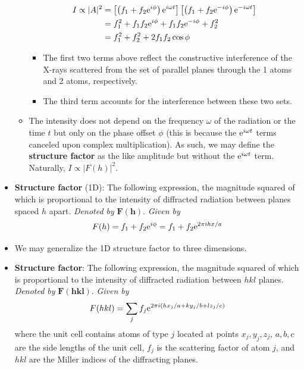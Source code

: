 \documentclass[../notes.tex]{subfiles}
\begin{document}
\begin{itemize}
\begin{itemize}
        \begin{align*}
            I \propto |A|^2 &= \left[ \left( f_1+f_2\e[i\phi] \right)\e[i\omega t] \right]\left[ \left( f_1+f_2\e[-i\phi] \right)\e[-i\omega t] \right]\\
            &= f_1^2+f_1f_2\e[i\phi]+f_1f_2\e[-i\phi]+f_2^2\\
            &= f_1^2+f_2^2+2f_1f_2\cos\phi
        \end{align*}
        \begin{itemize}
            \item The first two terms above reflect the constructive interference of the X-rays scattered from the set of parallel planes through the 1 atoms and 2 atoms, respectively.
            \item The third term accounts for the interference between these two sets.
        \end{itemize}
        \item The intensity does not depend on the frequency $\omega$ of the radiation or the time $t$ but only on the phase offset $\phi$ (this is because the $\e[i\omega t]$ terms canceled upon complex multiplication). As such, we may define the \textbf{structure factor} as the like amplitude but without the $\e[i\omega t]$ term. Naturally, $I\propto|F(h)|^2$.
    \end{itemize}
    \item \textbf{Structure factor} (1D): The following expression, the magnitude squared of which is proportional to the intensity of diffracted radiation between planes spaced $h$ apart. \emph{Denoted by} $\bm{F(h)}$. \emph{Given by}
    \begin{equation*}
        F(h) = f_1+f_2\e[i\phi]
        = f_1+f_2\e[2\pi ihx/a]
    \end{equation*}
    \item We may generalize the 1D structure factor to three dimensions.
    \item \textbf{Structure factor}: The following expression, the magnitude squared of which is proportional to the intensity of diffracted radiation between $hkl$ planes. \emph{Denoted by} $\bm{F(hkl)}$. \emph{Given by}
    \begin{equation*}
        F(hkl) = \sum_jf_j\e[2\pi i(hx_j/a+ky_j/b+lz_j/c)]
    \end{equation*}
    where the unit cell contains atoms of type $j$ located at points $x_j,y_j,z_j$, $a,b,c$ are the side lengths of the unit cell, $f_j$ is the scattering factor of atom $j$, and $hkl$ are the Miller indices of the diffracting planes.

\end{itemize}
\end{document}
